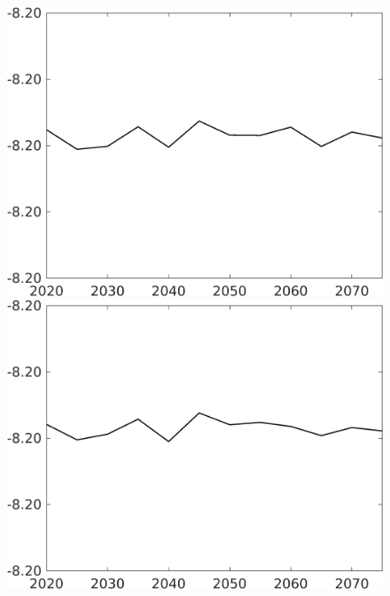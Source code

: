 \documentclass[12pt]{article}
\begin{document}
\begin{figure}[h!!]
\begin{minipage}[]{0.32\textwidth}
	\end{minipage}	
	\begin{minipage}[]{0.32\textwidth}
		\includegraphics[width=1\textwidth]{../../codding_model/own_basedOnFried/optimalPol_010922_revision/figures/all_13Sept22/CompTaul_Equlab_LFBAUPer_Reg0_F_spillover0_nsk1_xgr0_knspil0_sep1_countec0_GovRev0_etaa0.79.png}
	\end{minipage}	
	\begin{minipage}[]{0.32\textwidth}
		\includegraphics[width=1\textwidth]{../../codding_model/own_basedOnFried/optimalPol_010922_revision/figures/all_13Sept22/CompTaul_Equlab_LFBAUPer_Reg0_G_spillover0_nsk1_xgr0_knspil0_sep1_countec0_GovRev0_etaa0.79.png}

\end{minipage}
\end{figure}
\end{document}
